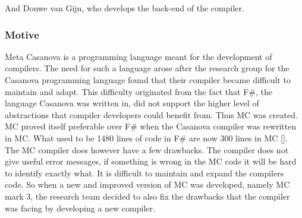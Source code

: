 And Douwe van Gijn, who develops the back-end of the compiler.

\subsubsection {Motive}

Meta Casanova is a programming language meant for the development of compilers. 
The need for such a language arose after the research group for the Casanova programming language found that their compiler became difficult to maintain and adapt. 
This difficulty originated from the fact that F\#, 
the language Casanova was written in, did not support the higher level of  abstractions that compiler developers could benefit from. 
Thus MC was created. 
MC proved itself preferable over F\# when the Casanova compiler was rewritten in MC. 
What used to be 1480 lines of code in F\# are now 300 lines in MC []. 
\linebreak
The MC compiler does however have a few drawbacks. 
The compiler does not give useful error messages, if something is wrong in the MC code it will be hard to identify exactly what. 
It is difficult to maintain and expand the compilers code. 
\linebreak
So when a new and improved version of MC was developed, namely MC mark 3,  
the research team decided to also fix the drawbacks that the compiler was facing by developing a new compiler. 

